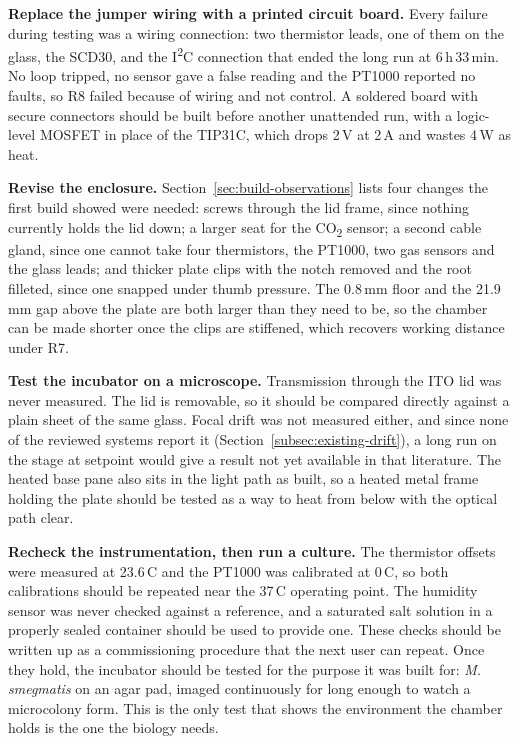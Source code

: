 \textbf{Replace the jumper wiring with a printed circuit board.} Every failure during testing was a wiring connection: two thermistor leads, one of them on the glass, the SCD30, and the I\textsuperscript{2}C connection that ended the long run at 6\,h\,33\,min. No loop tripped, no sensor gave a false reading and the PT1000 reported no faults, so R8 failed because of wiring and not control. A soldered board with secure connectors should be built before another unattended run, with a logic-level MOSFET in place of the TIP31C, which drops 2\,V at 2\,A and wastes 4\,W as heat.

\textbf{Revise the enclosure.} Section~\ref{sec:build-observations} lists four changes the first build showed were needed: screws through the lid frame, since nothing currently holds the lid down; a larger seat for the CO\textsubscript{2} sensor; a second cable gland, since one cannot take four thermistors, the PT1000, two gas sensors and the glass leads; and thicker plate clips with the notch removed and the root filleted, since one snapped under thumb pressure. The 0.8\,mm floor and the 21.9\,mm gap above the plate are both larger than they need to be, so the chamber can be made shorter once the clips are stiffened, which recovers working distance under R7.

\textbf{Test the incubator on a microscope.} Transmission through the ITO lid was never measured. The lid is removable, so it should be compared directly against a plain sheet of the same glass. Focal drift was not measured either, and since none of the reviewed systems report it (Section~\ref{subsec:existing-drift}), a long run on the stage at setpoint would give a result not yet available in that literature. The heated base pane also sits in the light path as built, so a heated metal frame holding the plate should be tested as a way to heat from below with the optical path clear.

\textbf{Recheck the instrumentation, then run a culture.} The thermistor offsets were measured at 23.6\,\textdegree{}C and the PT1000 was calibrated at 0\,\textdegree{}C, so both calibrations should be repeated near the 37\,\textdegree{}C operating point. The humidity sensor was never checked against a reference, and a saturated salt solution in a properly sealed container should be used to provide one. These checks should be written up as a commissioning procedure that the next user can repeat. Once they hold, the incubator should be tested for the purpose it was built for: \textit{M. smegmatis} on an agar pad, imaged continuously for long enough to watch a microcolony form. This is the only test that shows the environment the chamber holds is the one the biology needs.

\label{body:end}
